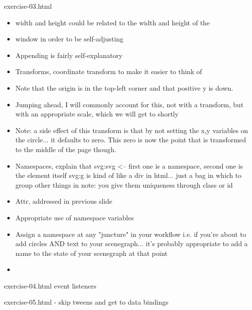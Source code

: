 \documentclass{beamer}
\begin{document}
\begin{frame}
\begin{block}{exercise-03.html}
\begin{itemize}
\begin{itemize}
                \item width and height could be related to the width and height of the 
                \item window in order to be self-adjusting
                \pause
                \item Appending is fairly self-explanatory
                \pause
                \item Transforms, coordinate transform to make it easier to think of
                \item Note that the origin is in the top-left corner and that positive y
                      is down.
                \item Jumping ahead, I will commonly account for this, not with a transform, but
                        with an appropriate scale, which we will get to shortly
                \item Note: a side effect of this transform is that by not setting the x,y variables
                        on the circle... it defaults to zero.  This zero is now the point that is
                        transformed to the middle of the page though.
                \pause
                \item Namespaces, explain that svg:svg <-- first one is a namespace, second
                one is the element itself
                svg:g is kind of like a div in html... just a bag in which to group other things
                in
                note: you give them uniqueness through class or id
                \pause
                \item Attr, addressed in previous slide
                \pause
                \item Appropriate use of namespace variables
                \item Assign a namespace at any "juncture" in your workflow
                    i.e. if you're about to add circles AND text to your scenegraph... it's
                        probably appropriate to add a name to the state of your scenegraph at
                        that point
                \pause
                \item 
            \end{itemize}
        \end{itemize}
    \end{block}
\end{frame}

exercise-04.html
event listeners

exercise-05.html
- skip tweens and get to data bindings
\end{document}
